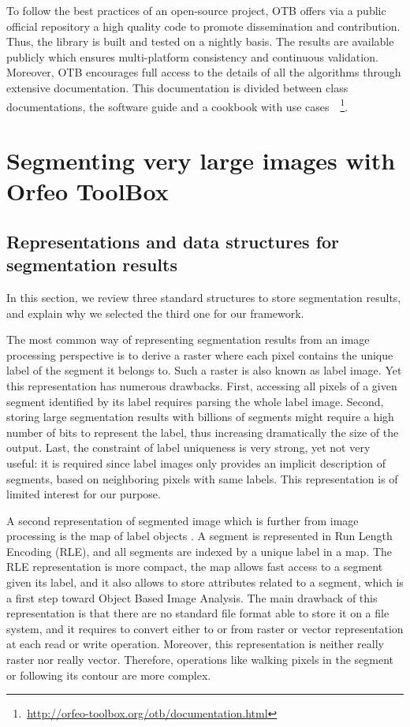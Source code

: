 \documentclass{josis}
\newcommand{\furl}[1]{    $\,$\footnote{$\,$\url{#1}}}
\begin{document}
To follow the best practices of an open-source project, OTB offers via a public official repository a high quality code to promote dissemination and contribution. Thus, the library is built and tested on a nightly basis. The results are available publicly which ensures multi-platform consistency and continuous validation. Moreover, OTB encourages full access to the details of all the algorithms through extensive documentation. This documentation is divided between class documentations, the software guide and a cookbook with use cases~\furl{http://orfeo-toolbox.org/otb/documentation.html}.

\section{Segmenting very large images with Orfeo ToolBox}


\subsection{Representations and data structures for segmentation results}

In this section, we review three standard structures to store
segmentation results, and explain why we selected the third one for
our framework.

The most common way of representing segmentation results from an image
processing perspective is to derive a raster where each pixel contains
the unique label of the segment it belongs to. Such a raster is also
known as label image. Yet this representation has numerous
drawbacks. First, accessing all pixels of a given segment identified
by its label requires parsing the whole label image. Second, storing
large segmentation results with billions of segments might require a
high number of bits to represent the label, thus increasing
dramatically the size of the output. Last, the constraint of label
uniqueness is very strong, yet not very useful: it is required since
label images only provides an implicit description of segments, based
on neighboring pixels with same labels. This representation is of
limited interest for our purpose.

A second representation of segmented image which is further from image
processing is the map of label objects \cite{lehmann2008label}. A segment is
represented in Run Length Encoding (RLE), and all segments are indexed
by a unique label in a map. The RLE representation is more compact,
the map allows fast access to a segment given its label, and it also
allows to store attributes related to a segment, which is a first step
toward Object Based Image Analysis. The main drawback of this
representation is that there are no standard file format able to store
it on a file system, and it requires to convert either to or from
raster or vector representation at each read or write
operation. Moreover, this representation is neither really raster nor
really vector. Therefore, operations like walking pixels in the
segment or following its contour are more complex.
\end{document}
